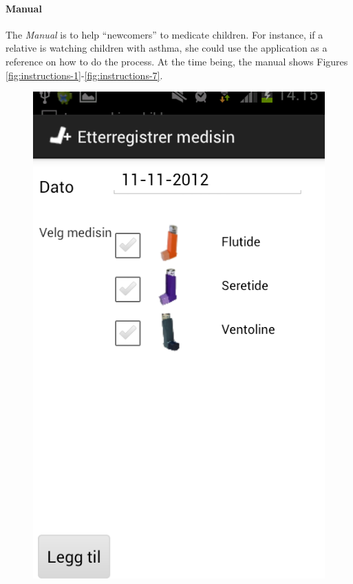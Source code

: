 \paragraph{Manual}
The \emph{Manual} is to help ``newcomers'' to medicate children. For instance, if a relative is watching children with asthma, she could use the application as a reference on how to do the process. At the time being, the manual shows Figures \ref{fig:instructions-1}-\ref{fig:instructions-7}. 
        
\begin{figure}[H]
	\begin{minipage}[b]{0.3\linewidth}
		\centering
		\includegraphics[width=0.20\paperwidth]{Pictures/app-screenshots/register_treatment.png}

\end{minipage}
\end{figure}
